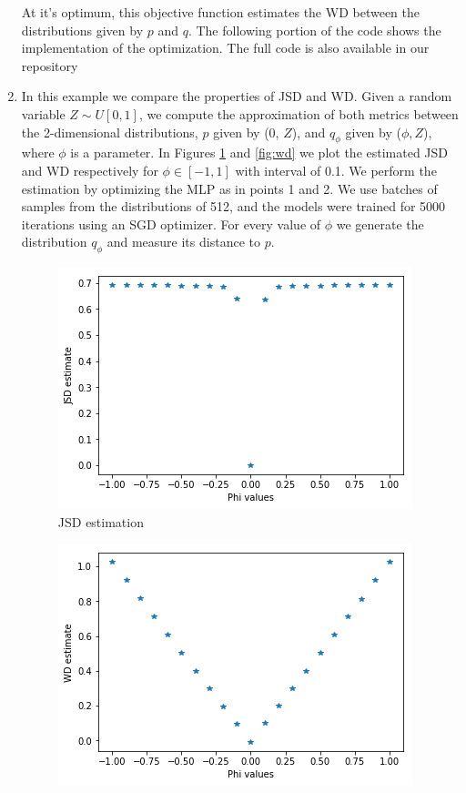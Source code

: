 \begin{enumerate}
	 At it's optimum, this objective function estimates the WD between the distributions given by $p$ and $q$.
%	
	The following portion of the code shows the implementation of the optimization. The full code is also available in our repository~\cite{github}
	
	
	
	\item In this example we compare the properties of JSD and WD.
	Given a random variable $Z\sim U[0,1]$, we compute the approximation of both metrics between the 2-dimensional distributions, $p$ given by (0, $Z$), and $q_\phi$ given by ($\phi, Z$), where $\phi$ is a parameter.
	In Figures \ref{fig:jsd} and \ref{fig:wd} we plot the estimated JSD and WD respectively for $\phi \in [-1,1]$ with interval of 0.1.
	We perform the estimation by optimizing the MLP as in points 1 and 2.
	We use batches of samples from the distributions of 512, and the models were trained for 5000 iterations using an SGD optimizer. For every value of $\phi$ we generate the distribution $q_\phi$ and measure its distance to $p$. 
	\begin{figure}[H]
		\centering
		\includegraphics[scale=0.8]{jsd.png}
		\caption{JSD estimation}
		\label{fig:jsd}
	\end{figure}
	\begin{figure}[H]
		\centering
		\includegraphics[scale=0.8]{wd.png}

\end{figure}
\end{enumerate}
